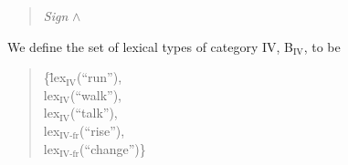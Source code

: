 \begin{quote}
\hspace*{-2em}\textit{Sign} \d{$\wedge$} \\
\hspace*{-2em}

\end{quote}

We define the set of lexical types of category IV,
B$_{\mathrm{IV}}$, to be
\begin{quote}
\begin{tabbing}
\{\=lex$_{\mathrm{IV}}$(``run''), \\
  \>lex$_{\mathrm{IV}}$(``walk''), \\
  \>lex$_{\mathrm{IV}}$(``talk''), \\
  \>lex$_{\mathrm{IV}\textrm{-}\mathrm{fr}}$(``rise''), \\
  \>lex$_{\mathrm{IV}\textrm{-}\mathrm{fr}}$(``change'')\}
\end{tabbing}
\end{quote}

